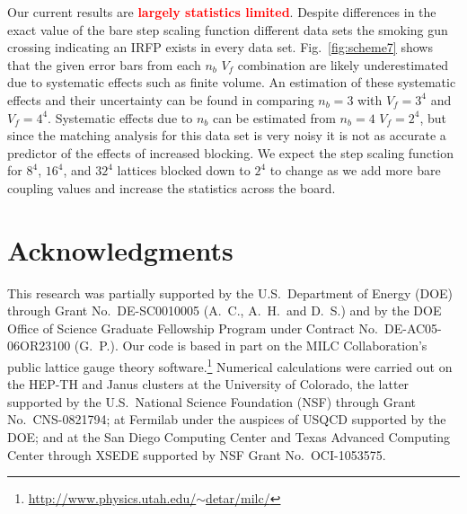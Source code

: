 \documentclass{PoS}
\newcommand{\fig}[1]{Fig.~\ref{#1}}
\newcommand{\TODO}[1]{\textcolor{red}{{\bf #1}}}
\begin{document}
Our current results are \TODO{largely statistics limited}. %
Despite differences in the exact value of the bare step scaling function different data sets the smoking gun crossing indicating an IRFP exists in every data set.
\fig{fig:scheme7} shows that the given error bars from each $n_b$ $V_f$ combination are likely underestimated due to systematic effects such as finite volume.
An estimation of these systematic effects and their uncertainty can be found in comparing $n_b = 3$ with $V_f = 3^4$ and $V_f = 4^4$.
Systematic effects due to $n_b$ can be estimated from $n_b = 4$ $V_f = 2^4$, but since the matching analysis for this data set is very noisy it is not as accurate a predictor of the effects of increased blocking.
We expect the step scaling function for $8^4$, $16^4$, and $32^4$ lattices blocked down to $2^4$ to change as we add more bare coupling values and increase the statistics across the board.



\section*{Acknowledgments}
This research was partially supported by the U.S.~Department of Energy (DOE) through Grant No.~DE-SC0010005 (A.~C., A.~H.\ and D.~S.) and by the DOE Office of Science Graduate Fellowship Program under Contract No.~DE-AC05-06OR23100 (G.~P.).
Our code is based in part on the MILC Collaboration's public lattice gauge theory software.\footnote{\href{http://www.physics.utah.edu/~detar/milc/}{http://www.physics.utah.edu/$\sim$detar/milc/}}
Numerical calculations were carried out on the HEP-TH and Janus clusters at the University of Colorado, the latter supported by the U.S.~National Science Foundation (NSF) through Grant No.~CNS-0821794; at Fermilab under the auspices of USQCD supported by the DOE; and at the San Diego Computing Center and Texas Advanced Computing Center through XSEDE supported by NSF Grant No.~OCI-1053575.


{\renewcommand{\baselinestretch}{0.86} %
  
  
}
\end{document}
